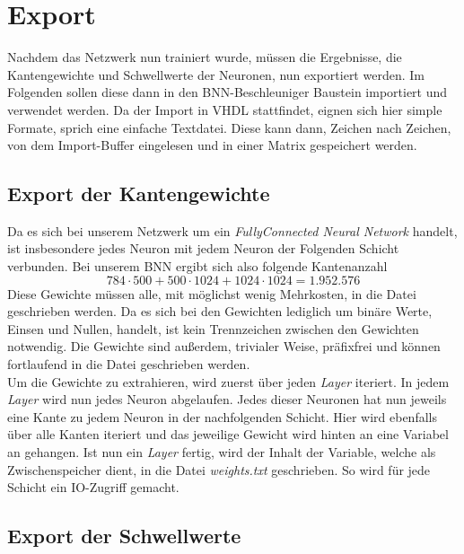 \chapter{Export}
Nachdem das Netzwerk nun trainiert wurde, müssen die Ergebnisse, die Kantengewichte und Schwellwerte der Neuronen, nun exportiert werden. Im Folgenden sollen diese dann in den BNN-Beschleuniger Baustein importiert und verwendet werden. Da der Import in VHDL stattfindet, eignen sich hier simple Formate, sprich eine einfache Textdatei. Diese kann dann, Zeichen nach Zeichen, von dem Import-Buffer eingelesen und in einer Matrix gespeichert werden.
\section{Export der Kantengewichte}\label{exportKanten}
Da es sich bei unserem Netzwerk um ein \textit{FullyConnected Neural Network} handelt, ist insbesondere jedes Neuron mit jedem Neuron der Folgenden Schicht verbunden. Bei unserem BNN ergibt sich also folgende Kantenanzahl
\[784 \cdot 500 + 500 \cdot 1024 + 1024 \cdot 1024 = 1.952.576 \]
Diese Gewichte müssen alle, mit möglichst wenig Mehrkosten, in die Datei geschrieben werden. Da es sich bei den Gewichten lediglich um binäre Werte, Einsen und Nullen, handelt, ist kein Trennzeichen zwischen den Gewichten notwendig. Die Gewichte sind außerdem, trivialer Weise, präfixfrei und können fortlaufend in die Datei geschrieben werden.\\
Um die Gewichte zu extrahieren, wird zuerst über jeden \textit{Layer} iteriert. In jedem \textit{Layer} wird nun jedes Neuron abgelaufen. Jedes dieser Neuronen hat nun jeweils eine Kante zu jedem Neuron in der nachfolgenden Schicht. Hier wird ebenfalls über alle Kanten iteriert und das jeweilige Gewicht wird hinten an eine Variabel an gehangen. Ist nun ein \textit{Layer} fertig, wird der Inhalt der Variable, welche als Zwischenspeicher dient, in die Datei \textit{weights.txt} geschrieben. So wird für jede Schicht ein IO-Zugriff gemacht.
\section{Export der Schwellwerte}
